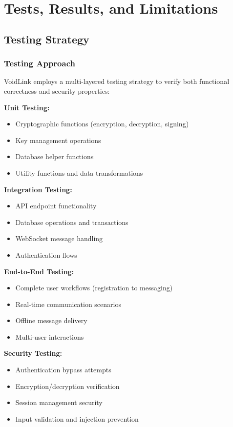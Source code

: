 \chapter{Tests, Results, and Limitations}

\section{Testing Strategy}

\subsection{Testing Approach}

VoidLink employs a multi-layered testing strategy to verify both functional correctness and security properties:

\textbf{Unit Testing:}
\begin{itemize}
    \item Cryptographic functions (encryption, decryption, signing)
    \item Key management operations
    \item Database helper functions
    \item Utility functions and data transformations
\end{itemize}

\textbf{Integration Testing:}
\begin{itemize}
    \item API endpoint functionality
    \item Database operations and transactions
    \item WebSocket message handling
    \item Authentication flows
\end{itemize}

\textbf{End-to-End Testing:}
\begin{itemize}
    \item Complete user workflows (registration to messaging)
    \item Real-time communication scenarios
    \item Offline message delivery
    \item Multi-user interactions
\end{itemize}

\textbf{Security Testing:}
\begin{itemize}
    \item Authentication bypass attempts
    \item Encryption/decryption verification
    \item Session management security
    \item Input validation and injection prevention
\end{itemize}

